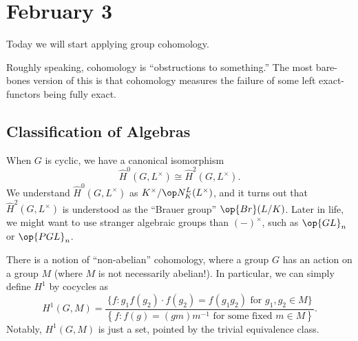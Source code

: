 \documentclass[../notes.tex]{subfiles}
\begin{document}
\section{February 3}

Today we will start applying group cohomology.
\begin{remark}
	Roughly speaking, cohomology is ``obstructions to something.'' The most bare-bones version of this is that cohomology measures the failure of some left exact-functors being fully exact.
\end{remark}

\subsection{Classification of Algebras}
When $G$ is cyclic, we have a canonical isomorphism
\[\widehat H^0(G,L^\times)\cong\widehat H^2(G,L^\times).\]
We understand $\widehat H^0(G,L^\times)$ as $K^\times/\op N^L_K(L^\times)$, and it turns out that $\widehat H^2(G,L^\times)$ is understood as the ``Brauer group'' $\op{Br}(L/K)$. Later in life, we might want to use stranger algebraic groups than $(-)^\times$, such as $\op{GL}_n$ or $\op{PGL}_n$.

There is a notion of ``non-abelian'' cohomology, where a group $G$ has an action on a group $M$ (where $M$ is not necessarily abelian!). In particular, we can simply define $H^1$ by cocycles as
\[H^1(G,M)=\frac{\{f:g_1f(g_2)\cdot f(g_2)=f(g_1g_2)\text{ for }g_1,g_2\in M\}}{\left\{f:f(g)=(gm)m^{-1}\text{ for some fixed }m\in M\right\}}.\]
Notably, $H^1(G,M)$ is just a set, pointed by the trivial equivalence class.
\end{document}

